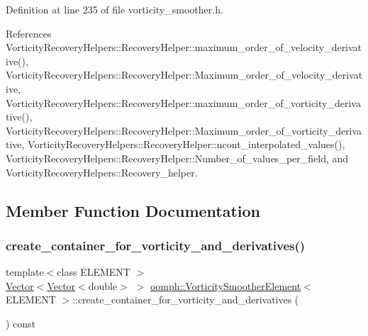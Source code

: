 Definition at line 235 of file vorticity\+\_\+smoother.\+h.



References Vorticity\+Recovery\+Helpers\+::\+Recovery\+Helper\+::maximum\+\_\+order\+\_\+of\+\_\+velocity\+\_\+derivative(), Vorticity\+Recovery\+Helpers\+::\+Recovery\+Helper\+::\+Maximum\+\_\+order\+\_\+of\+\_\+velocity\+\_\+derivative, Vorticity\+Recovery\+Helpers\+::\+Recovery\+Helper\+::maximum\+\_\+order\+\_\+of\+\_\+vorticity\+\_\+derivative(), Vorticity\+Recovery\+Helpers\+::\+Recovery\+Helper\+::\+Maximum\+\_\+order\+\_\+of\+\_\+vorticity\+\_\+derivative, Vorticity\+Recovery\+Helpers\+::\+Recovery\+Helper\+::ncont\+\_\+interpolated\+\_\+values(), Vorticity\+Recovery\+Helpers\+::\+Recovery\+Helper\+::\+Number\+\_\+of\+\_\+values\+\_\+per\+\_\+field, and Vorticity\+Recovery\+Helpers\+::\+Recovery\+\_\+helper.



\subsection{Member Function Documentation}
\mbox{\label{classoomph_1_1VorticitySmootherElement_a84300b8d30090a7275a1e0233546b683}} 
\subsubsection{\texorpdfstring{create\+\_\+container\+\_\+for\+\_\+vorticity\+\_\+and\+\_\+derivatives()}{create\_container\_for\_vorticity\_and\_derivatives()}}
{\footnotesize\ttfamily template$<$class E\+L\+E\+M\+E\+NT $>$ \\
\hyperlink{classoomph_1_1Vector}{Vector}$<$\hyperlink{classoomph_1_1Vector}{Vector}$<$double$>$ $>$ \hyperlink{classoomph_1_1VorticitySmootherElement}{oomph\+::\+Vorticity\+Smoother\+Element}$<$ E\+L\+E\+M\+E\+NT $>$\+::create\+\_\+container\+\_\+for\+\_\+vorticity\+\_\+and\+\_\+derivatives (\begin{DoxyParamCaption}{ }\end{DoxyParamCaption}) const\hspace{0.3cm}{\ttfamily [inline]}}



